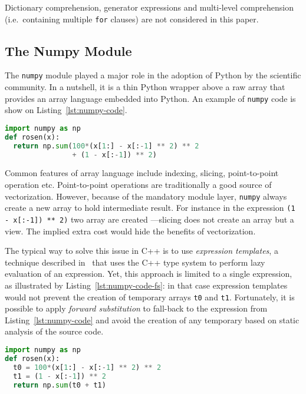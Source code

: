 \documentclass[preprint]{sigplanconf}
\begin{document}
Dictionary comprehension, generator expressions and multi-level comprehension
(i.e.\ containing multiple \texttt{for} clauses) are not considered in this
paper.

\subsection{The Numpy Module}

The \texttt{numpy} module played a major role in the adoption of Python by the
scientific community. In a nutshell, it is a thin Python wrapper above a raw
array that provides an array language embedded into Python. An example of
\texttt{numpy} code is show on Listing~\ref{lst:numpy-code}.

\begin{lstlisting}[language=python, label={lst:numpy-code}, caption={Sample \texttt{numpy} code.}]
import numpy as np
def rosen(x):
  return np.sum(100*(x[1:] - x[:-1] ** 2) ** 2
                + (1 - x[:-1]) ** 2)
\end{lstlisting}

Common features of array language include indexing, slicing, point-to-point
operation etc. Point-to-point operations are traditionally a good source of
vectorization. However, because of the mandatory module layer, \texttt{numpy}
always create a new array to hold intermediate result. For instance in the
expression \texttt{(1 - x[:-1]) ** 2)} two array are created ---slicing does
not create an array but a view. The implied extra cost would hide the benefits
of vectorization.

The typical way to solve this issue in C++ is to use \emph{expression
templates}, a technique described in~\cite{expression_templates} that uses the
C++ type system to perform lazy evaluation of an expression. Yet, this
approach is limited to a single expression, as illustrated by Listing~\ref{lst:numpy-code-fs}: in that case expression templates would not prevent the creation
of temporary arrays \texttt{t0} and \texttt{t1}. Fortunately, it is possible to
apply \emph{forward substitution} to fall-back to the expression from
Listing~\ref{lst:numpy-code} and avoid the creation of any temporary based on
static analysis of the source code.

\begin{lstlisting}[language=python, label={lst:numpy-code-fs}, caption={Sample \texttt{numpy} code requiring forward subsitution.}]
import numpy as np
def rosen(x):
  t0 = 100*(x[1:] - x[:-1] ** 2) ** 2
  t1 = (1 - x[:-1]) ** 2
  return np.sum(t0 + t1)
\end{lstlisting}
\end{document}

